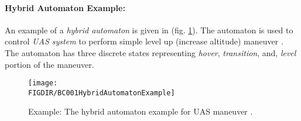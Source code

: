 \paragraph{Hybrid Automaton Example:} An example of a \emph{hybrid automaton} is given in (fig. \ref{fig:hybridAtomatonExample}). The automaton is used to control \emph{UAS system} to perform simple level up (increase altitude) maneuver \cite{casau2011uav}. The automaton has three discrete states representing \emph{hover}, \emph{transition}, and, \emph{level} portion of the maneuver.

\begin{figure}[H]
    \centering
    \texttt{[image: \\FIGDIR/BC001HybridAutomatonExample]} 
    \caption{Example: The hybrid automaton example for UAS maneuver \cite{casau2011uav}.}
    \label{fig:hybridAtomatonExample}
\end{figure}
